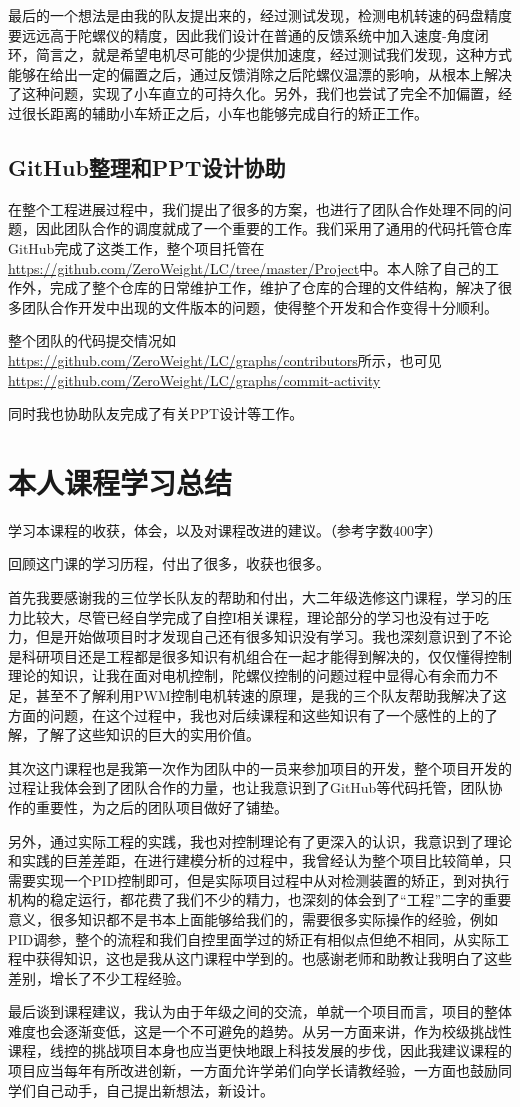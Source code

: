 \documentclass[UTF8,a4paper]{paper}
\begin{document}
最后的一个想法是由我的队友提出来的，经过测试发现，检测电机转速的码盘精度要远远高于陀螺仪的精度，因此我们设计在普通的反馈系统中加入速度-角度闭环，简言之，就是希望电机尽可能的少提供加速度，经过测试我们发现，这种方式能够在给出一定的偏置之后，通过反馈消除之后陀螺仪温漂的影响，从根本上解决了这种问题，实现了小车直立的可持久化。另外，我们也尝试了完全不加偏置，经过很长距离的辅助小车矫正之后，小车也能够完成自行的矫正工作。

\subsection{GitHub整理和PPT设计协助}
在整个工程进展过程中，我们提出了很多的方案，也进行了团队合作处理不同的问题，因此团队合作的调度就成了一个重要的工作。我们采用了通用的代码托管仓库GitHub完成了这类工作，整个项目托管在
\url{https://github.com/ZeroWeight/LC/tree/master/Project}中。本人除了自己的工作外，完成了整个仓库的日常维护工作，维护了仓库的合理的文件结构，解决了很多团队合作开发中出现的文件版本的问题，使得整个开发和合作变得十分顺利。

整个团队的代码提交情况如\url{https://github.com/ZeroWeight/LC/graphs/contributors}所示，也可见\url{https://github.com/ZeroWeight/LC/graphs/commit-activity}

同时我也协助队友完成了有关PPT设计等工作。

\clearpage\section{本人课程学习总结}
学习本课程的收获，体会，以及对课程改进的建议。（参考字数400字）

回顾这门课的学习历程，付出了很多，收获也很多。

首先我要感谢我的三位学长队友的帮助和付出，大二年级选修这门课程，学习的压力比较大，尽管已经自学完成了自控I相关课程，理论部分的学习也没有过于吃力，但是开始做项目时才发现自己还有很多知识没有学习。我也深刻意识到了不论是科研项目还是工程都是很多知识有机组合在一起才能得到解决的，仅仅懂得控制理论的知识，让我在面对电机控制，陀螺仪控制的问题过程中显得心有余而力不足，甚至不了解利用PWM控制电机转速的原理，是我的三个队友帮助我解决了这方面的问题，在这个过程中，我也对后续课程和这些知识有了一个感性的上的了解，了解了这些知识的巨大的实用价值。

其次这门课程也是我第一次作为团队中的一员来参加项目的开发，整个项目开发的过程让我体会到了团队合作的力量，也让我意识到了GitHub等代码托管，团队协作的重要性，为之后的团队项目做好了铺垫。

另外，通过实际工程的实践，我也对控制理论有了更深入的认识，我意识到了理论和实践的巨差差距，在进行建模分析的过程中，我曾经认为整个项目比较简单，只需要实现一个PID控制即可，但是实际项目过程中从对检测装置的矫正，到对执行机构的稳定运行，都花费了我们不少的精力，也深刻的体会到了“工程”二字的重要意义，很多知识都不是书本上面能够给我们的，需要很多实际操作的经验，例如PID调参，整个的流程和我们自控里面学过的矫正有相似点但绝不相同，从实际工程中获得知识，这也是我从这门课程中学到的。也感谢老师和助教让我明白了这些差别，增长了不少工程经验。

最后谈到课程建议，我认为由于年级之间的交流，单就一个项目而言，项目的整体难度也会逐渐变低，这是一个不可避免的趋势。从另一方面来讲，作为校级挑战性课程，线控的挑战项目本身也应当更快地跟上科技发展的步伐，因此我建议课程的项目应当每年有所改进创新，一方面允许学弟们向学长请教经验，一方面也鼓励同学们自己动手，自己提出新想法，新设计。
\end{document}
